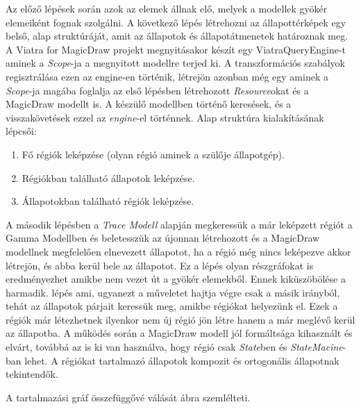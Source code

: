 Az előző lépések során azok az elemek állnak elő, melyek a modellek gyökér elemeiként fognak szolgálni. A következő lépés létrehozni az állapottérképek egy belső, alap struktúráját, amit az állapotok és állapotátmenetek határoznak meg. A Viatra for MagicDraw projekt megnyitásakor készít egy ViatraQueryEngine-t aminek a \emph{Scope}-ja a megnyitott modellre terjed ki. A transzformációs szabályok regisztrálása ezen az engine-en történik, létrejön azonban még egy aminek a \emph{Scope}-ja magába foglalja az első lépésben létrehozott \emph{Resource}okat és a MagicDraw modellt is. A készülő modellben történő keresések, és a visszakövetések ezzel az \emph{engine}-el történnek. Alap struktúra kialakításának lépcsői:

\begin{enumerate}
	\item Fő régiók leképzése (olyan régió aminek a szülője állapotgép).
	\label{enum:elso}
	\item Régiókban található állapotok leképzése.
	\label{enum:masodik}
	\item Állapotokban található régiók leképzése.
	\label{enum:harmadik}
\end{enumerate}


A második lépésben a \emph{Trace Modell} alapján megkeressük a már leképzett régiót a Gamma Modellben és beletesszük az újonnan létrehozott és a MagicDraw modellnek megfelelően elnevezett állapotot, ha a régió még nincs leképezve akkor létrejön, és abba kerül bele az állapotot. Ez a lépés olyan részgráfokat is eredményezhet amikbe nem vezet út a gyökér elemekből. Ennek kiküszöbölése a harmadik. lépés ami, ugyanezt a műveletet hajtja végre csak a másik irányból, tehát az állapotok párjait keressük meg, amikbe régiókat helyezünk el. Ezek a régiók már létezhetnek ilyenkor nem új régió jön létre hanem a már meglévő kerül az állapotba. A működés során a MagicDraw modell jól formáltsága kihasznált és elvárt, továbbá az is ki van használva, hogy régió csak \emph{State}ben és \emph{StateMacine}-ban lehet. A régiókat tartalmazó állapotok kompozit és ortogonális állapotnak tekintendők.

A tartalmazási gráf összefüggővé válását  ábra szemlélteti.

